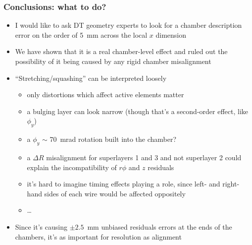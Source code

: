 \documentclass[compress]{beamer}
\begin{document}
\begin{frame}
\frametitle{Conclusions: what to do?}
\begin{itemize}\setlength{\itemsep}{0.2 cm}
\item I would like to ask DT geometry experts to look for a chamber
  description error on the order of 5~mm across the local $x$
  dimension

\item We have shown that it is a real chamber-level effect and ruled
  out the possibility of it being caused by any rigid chamber misalignment

\item ``Stretching/squashing'' can be interpreted loosely
\begin{itemize}
\item only distortions which affect active elements matter
\item a bulging layer can look narrow (though that's a second-order effect, like $\phi_y$)
\item a $\phi_y$ $\sim$ 70~mrad rotation built into the chamber?
\item a $\Delta R$ misalignment for superlayers 1 and 3 and not superlayer 2 could explain the incompatibility of $r\phi$ and $z$ residuals
\item it's hard to imagine timing effects playing a role, since left- and right-hand sides of each wire would be affected oppositely
\item \ldots
\end{itemize}

\item Since it's causing $\pm 2.5$~mm unbiased residuals errors at the ends of
  the chambers, it's as important for resolution as alignment

\end{itemize}
\end{frame}
\end{document}
